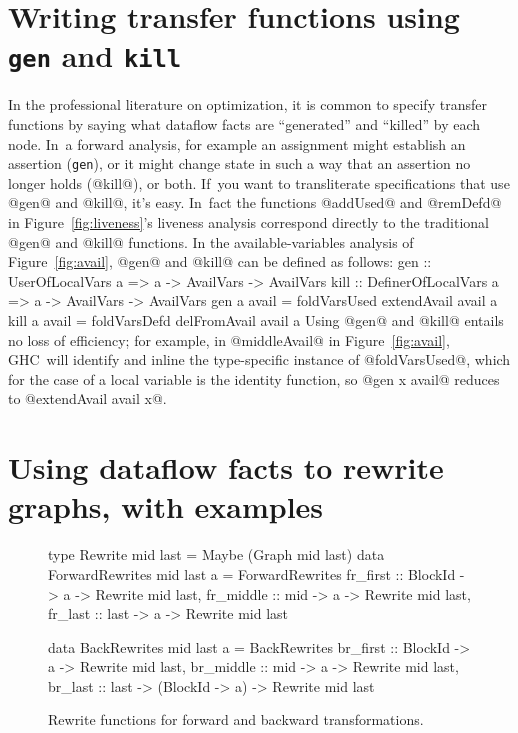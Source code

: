 \documentclass[blockstyle,preprint,nocopyrightspace]{sigplanconf}
\newenvironment{smallcode}{\small\verbatim}{\endverbatim}
\newcommand{\authornote}[1]{{\em #1}}
\def\authornote#1{\unskip\relax}
\newcommand{\norman}[1]{\authornote{NR: #1}}
\let\remark\norman
\newcommand\seclabel[1]{\label{sec:#1}}
\newcommand\figref[1]{Figure~\ref{fig:#1}}
\newcommand\figlabel[1]{\label{fig:#1}}
\begin{document}
\ifgenkill
\section{Writing transfer functions using \texttt{gen} and \texttt{kill}}

\seclabel{gen-kill}

In the professional literature on optimization, it is common to specify
transfer functions by saying what dataflow facts are ``generated'' and
``killed'' by each node.
In~a forward analysis, for example an assignment might establish an
assertion (\texttt{gen}), or it might change state in such a way that an
assertion no longer holds (@kill@), or both.
If~you want to transliterate specifications that use @gen@ and @kill@,
it's easy.
In~fact the functions @addUsed@ and @remDefd@ in \figref{liveness}'s
liveness analysis correspond directly to the traditional @gen@ and
@kill@ functions.
In the available-variables analysis of \figref{avail}, @gen@ and
@kill@ can be defined as follows:
\begin{smallcode}
gen  :: UserOfLocalVars    a => a -> AvailVars -> AvailVars
kill :: DefinerOfLocalVars a => a -> AvailVars -> AvailVars
gen  a avail = foldVarsUsed extendAvail  avail a
kill a avail = foldVarsDefd delFromAvail avail a
\end{smallcode}
Using @gen@ and @kill@ entails no loss of efficiency;
for example, in @middleAvail@ in \figref{avail}, GHC~will identify and
inline the type-specific instance of @foldVarsUsed@, which for the
case of a local variable is the identity function, so @gen x avail@
reduces to @extendAvail avail x@.

\fi


\section{Using dataflow facts to rewrite graphs, with examples}

\seclabel{rewrites}

\remark{Orphaned text:
Analyzing a subgraph also uses a non-bottom entry fact.
For example, if a rewrite function proposes to replace 
@z = x + y@ with @z = 7 + y@, an analysis will be run on the one-node
graph @z = 7 + y@ with input fact
$@x == 7@ \land @y == 8@$.
}

\seclabel{example-rewrites}

\begin{figure}
\begin{code}
type Rewrite mid last = Maybe (Graph mid last)
data ForwardRewrites mid last a = ForwardRewrites
 {fr_first  :: BlockId -> a -> Rewrite mid last,
  fr_middle :: mid     -> a -> Rewrite mid last,
  fr_last   :: last    -> a -> Rewrite mid last} 

data BackRewrites mid last a = BackRewrites
 {br_first  :: BlockId  -> a  -> Rewrite mid last,
  br_middle :: mid      -> a  -> Rewrite mid last,
  br_last   :: last ->
               (BlockId -> a) -> Rewrite mid last} 
\end{code}
\caption{Rewrite functions for forward and backward transformations.}
\figlabel{rewrites}
\end{figure}
\end{document}
